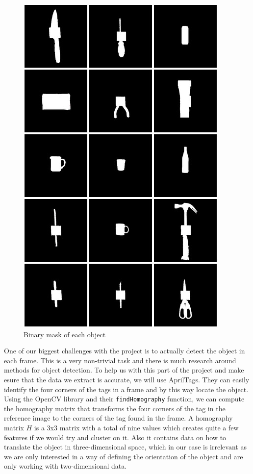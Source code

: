 \begin{figure}
	\centering
	\includegraphics[width=\textwidth]{img/methods/masks.jpg}
	\caption{Binary mask of each object}
	\label{fig:masks_montage}
\end{figure}

One of our biggest challenges with the project is to actually detect the object in each frame. This is a very non-trivial task and there is much research around methods for object detection. To help us with this part of the project and make esure that the data we extract is accurate, we will use AprilTags. They can easily identify the four corners of the tags in a frame and by this way locate the object. Using the OpenCV library and their \texttt{findHomography} function, we can compute the homography matrix that transforms the four corners of the tag in the reference image to the corners of the tag found in the frame. A homography matrix \(H\) is a 3x3 matrix with a total of nine values which creates quite a few features if we would try and cluster on it. Also it contains data on how to translate the object in three-dimensional space, which in our case is irrelevant as we are only interested in a way of defining the orientation of the object and are only working with two-dimensional data.


